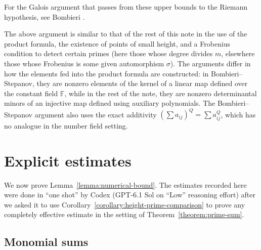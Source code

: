 \documentclass[reqno]{amsart} 
\begin{document}
For the Galois argument that passes from these upper bounds to the Riemann hypothesis, see Bombieri \cite[\S III]{Bombieri1974CountingPoints}.

\begin{remark}
  The above argument is similar to that of the rest of this note in the use of the product formula, the existence of points of small height, and a Frobenius condition to detect certain primes (here those whose degree divides $m$, elsewhere those whose Frobenius is some given automorphism $\sigma$).  The arguments differ in how the elements fed into the product formula are constructed: in Bombieri--Stepanov, they are nonzero elements of the kernel of a linear map defined over the constant field $\mathbb{F}$, while in the rest of the note, they are nonzero determinantal minors of an injective map defined using auxiliary polynomials.  The Bombieri--Stepanov argument also uses the exact additivity $(\sum a_{i j})^Q = \sum a_{i j}^Q$, which has no analogue in the number field setting.
\end{remark}

\section{Explicit estimates}\label{section:explicit}

We now prove Lemma~\ref{lemma:numerical-bound}.  The estimates recorded here were done in ``one shot'' by Codex (GPT-6.1 Sol on ``Low'' reasoning effort) after we asked it to use Corollary~\ref{corollary:height-prime-comparison} to prove any completely effective estimate in the setting of Theorem~\ref{theorem:prime-sum}.

\subsection{Monomial sums}\label{sec:cus71nhu98}
\end{document}
